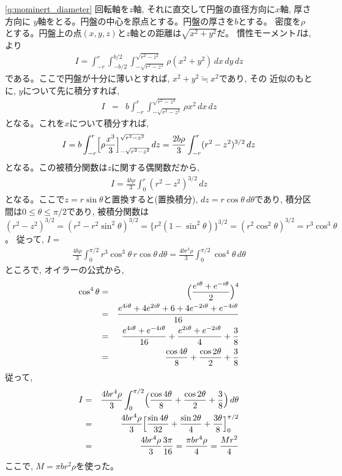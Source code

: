 \begin{q}
\ref{q:mominert_diameter}
回転軸を$z$軸, それに直交して円盤の直径方向に$x$軸, 厚さ方向に
$y$軸をとる。円盤の中心を原点とする。円盤の厚さを$b$とする。
密度を$\rho$とする。円盤上の点$(x, y, z)$と$z$軸との距離は$\sqrt{x^2+y^2}$だ。
慣性モーメント$I$は, より
\begin{eqnarray*}
I=\int_{-r}^{r}\int_{-b/2}^{b/2}\int_{-\sqrt{r^2-z^2}}^{\sqrt{r^2-z^2}}\rho(x^2+y^2)\,dx\,dy\,dz
\end{eqnarray*}
である。ここで円盤が十分に薄いとすれば, $x^2+y^2\fallingdotseq x^2$であり, その
近似のもとに, $y$について先に積分すれば, 
\begin{eqnarray}
I&=&b\int_{-r}^{r}\int_{-\sqrt{r^2-z^2}}^{\sqrt{r^2-z^2}}\rho x^2\,dx\,dz
\end{eqnarray}
となる。これを$x$について積分すれば, 
\begin{eqnarray*}
I=b\int_{-r}^{r}\Bigl[\rho\frac{x^3}{3}\Bigr]_{-\sqrt{r^2-z^2}}^{\sqrt{r^2-z^2}}\,dz
=\frac{2b\rho}{3}\int_{-r}^{r}(r^2-z^2)^{3/2}\,dz
\end{eqnarray*}
となる。この被積分関数は$z$に関する偶関数だから, 
\begin{eqnarray}
I=\frac{4b\rho}{3}\int_{0}^{r}(r^2-z^2)^{3/2}\,dz
\end{eqnarray}
となる。ここで$z=r\sin\theta$と置換すると(置換積分), 
$dz=r\cos\theta\,d\theta$であり, 積分区間は$0\leq\theta\leq\pi/2$であり, 
被積分関数は
$(r^2-z^2)^{3/2}=(r^2-r^2\sin^2\theta)^{3/2}
               =\{r^2(1-\sin^2\theta)\}^{3/2}
               =(r^2\cos^2\theta)^{3/2}=r^3\cos^3\theta$。
従って, $I=$
\begin{eqnarray*}
\frac{4b\rho}{3}\int_{0}^{\pi/2}r^3\cos^3\theta\,r\cos\theta\,d\theta
 =\frac{4br^4\rho}{3}\int_{0}^{\pi/2}\cos^4\theta\,d\theta
\end{eqnarray*}
ところで, オイラーの公式から, 
\begin{eqnarray}
\cos^4\theta&=&\Bigl(\frac{e^{i\theta}+e^{-i\theta}}{2}\Bigr)^4\nonumber\\
             &=&\frac{e^{4i\theta}+4e^{2i\theta}+6+4e^{-2i\theta}+e^{-4i\theta}}{16}\nonumber\\
             &=&\frac{e^{4i\theta}+e^{-4i\theta}}{16}+\frac{e^{2i\theta}+e^{-2i\theta}}{4}+\frac{3}{8}\nonumber\\
             &=&\frac{\cos 4\theta}{8}+\frac{\cos2\theta}{2}+\frac{3}{8}
\end{eqnarray}
従って, 
\begin{eqnarray}
I&=&\frac{4br^4\rho}{3}\int_{0}^{\pi/2}\Bigl(\frac{\cos 4\theta}{8}+\frac{\cos2\theta}{2}+\frac{3}{8}\Bigr)\,d\theta\nonumber\\
 &=&\frac{4br^4\rho}{3}\Bigl[\frac{\sin 4\theta}{32}+\frac{\sin2\theta}{4}+\frac{3\theta}{8}\Bigr]_0^{\pi/2}\nonumber\\
 &=&\frac{4br^4\rho}{3}\frac{3\pi}{16}=\frac{\pi br^4\rho}{4}=\frac{Mr^2}{4}
\end{eqnarray}
ここで, $M=\pi b r^2 \rho$を使った。\mv


\end{q}
